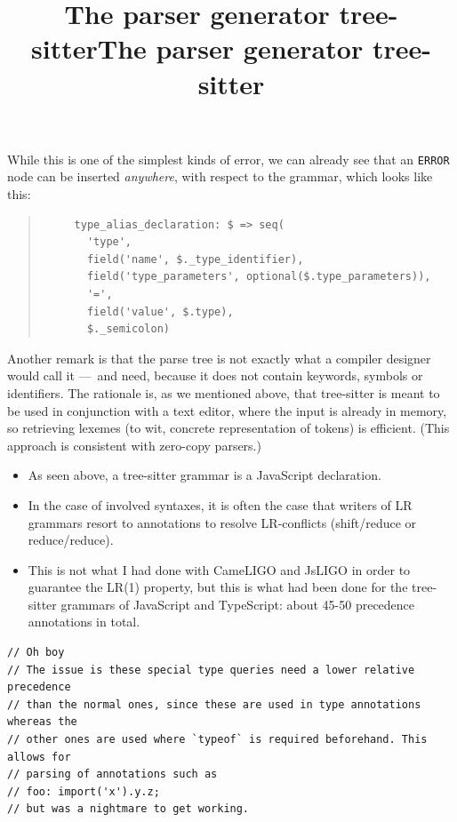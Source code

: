 \documentclass[wide]{slides}
\newcommand{\JsLIGO}[0]{\textsf{JsLIGO}}
\newcommand{\CameLIGO}[0]{\textsf{CameLIGO}}
\newcommand{\JavaScript}[0]{\textsf{JavaScript}}
\newcommand{\TypeScript}[0]{\textsf{TypeScript}}
\newcommand{\TreeSitter}[0]{\textsf{tree-sitter}}
\begin{document}
\begin{slide}
  \title{The parser generator tree-sitter}

  While this is one of the simplest kinds of error, we can already
  see that an \verb|ERROR| node can be inserted \emph{anywhere}, with
  respect to the grammar, which looks like this:
  \begin{quote}
    \small
    \begin{verbatim}
     type_alias_declaration: $ => seq(
       'type',
       field('name', $._type_identifier),
       field('type_parameters', optional($.type_parameters)),
       '=',
       field('value', $.type),
       $._semicolon)
    \end{verbatim}
  \end{quote}
  Another remark is that the parse tree is not exactly what a compiler
  designer would call it ---~and need, because it does not contain
  keywords, symbols or identifiers. The rationale is, as we mentioned
  above, that \TreeSitter{} is meant to be used in conjunction with a
  text editor, where the input is already in memory, so retrieving
  lexemes (to wit, concrete representation of tokens) is
  efficient. (This approach is consistent with zero\hyp{}copy
  parsers.)

\end{slide}

\begin{slide}
  \title{The parser generator tree-sitter}

  \begin{itemize}

    \item As seen above, a \TreeSitter{} grammar is a \JavaScript{}
      declaration.

    \item In the case of involved syntaxes, it is often the case that
      writers of LR grammars resort to annotations to resolve
      LR\hyp{}conflicts (shift/reduce or reduce/reduce).

    \item This is not what I had done with \CameLIGO{} and \JsLIGO{}
      in order to guarantee the LR(1) property, but this is what had
      been done for the \TreeSitter{} grammars of \JavaScript{} and
      \TypeScript{}: about 45-50 precedence annotations in total.

  \end{itemize}
  \small
  \begin{verbatim}
// Oh boy
// The issue is these special type queries need a lower relative precedence
// than the normal ones, since these are used in type annotations whereas the
// other ones are used where `typeof` is required beforehand. This allows for
// parsing of annotations such as
// foo: import('x').y.z;
// but was a nightmare to get working.
    \end{verbatim}

\end{slide}
\end{document}
